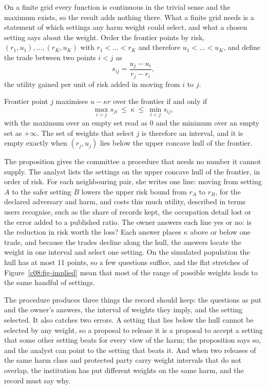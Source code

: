 On a finite grid every function is continuous in the trivial sense and the maximum
exists, so the result adds nothing there. What a finite grid needs is a statement of
which settings any harm weight could select, and what a chosen setting says about
the weight. Order the frontier points by risk, $(r_1, u_1), \dots, (r_K, u_K)$ with
$r_1 < \dots < r_K$ and therefore $u_1 < \dots < u_K$, and define the trade between
two points $i < j$ as
\[
s_{ij} = \frac{u_j - u_i}{r_j - r_i},
\]
the utility gained per unit of risk added in moving from $i$ to $j$.

\begin{proposition}\label{c08:prop-bracket}
Frontier point $j$ maximises $u - \kappa r$ over the frontier if and only if
\begin{equation}\label{c08:eq-bracket}
\max_{i > j} s_{ji} \ \le\ \kappa\ \le\ \min_{i < j} s_{ij},
\end{equation}
with the maximum over an empty set read as $0$ and the minimum over an empty set as
$+\infty$. The set of weights that select $j$ is therefore an interval, and it is
empty exactly when $(r_j, u_j)$ lies below the upper concave hull of the frontier.
\end{proposition}

The proposition gives the committee a procedure that needs no number it cannot
supply. The analyst lists the settings on the upper concave hull of the frontier,
in order of risk. For each neighbouring pair, she writes one line: moving from
setting $A$ to the safer setting $B$ lowers the upper risk bound from $r_A$ to $r_B$,
for the declared adversary and harm, and costs this much utility, described in terms
users recognise, such as the share of records kept, the occupation detail lost or
the error added to a published ratio. The owner answers each line yes or no: is the
reduction in risk worth the loss? Each answer places $\kappa$ above or below one
trade, and because the trades decline along the hull, the answers locate the weight
in one interval and select one setting. On the simulated population the hull has
at most 11 points, so a few questions suffice, and the flat stretches of
Figure~\ref{c08:fig-implied} mean that most of the range of possible weights leads
to the same handful of settings.

The procedure produces three things the record should keep: the questions as put
and the owner's answers, the interval of weights they imply, and the setting
selected. It also catches two errors. A setting that lies below the hull cannot be
selected by any weight, so a proposal to release it is a proposal to accept a
setting that some other setting beats for every view of the harm; the proposition
says so, and the analyst can point to the setting that beats it. And when two
releases of the same harm class and protected party carry weight intervals that do
not overlap, the institution has put different weights on the same harm, and the
record must say why.

